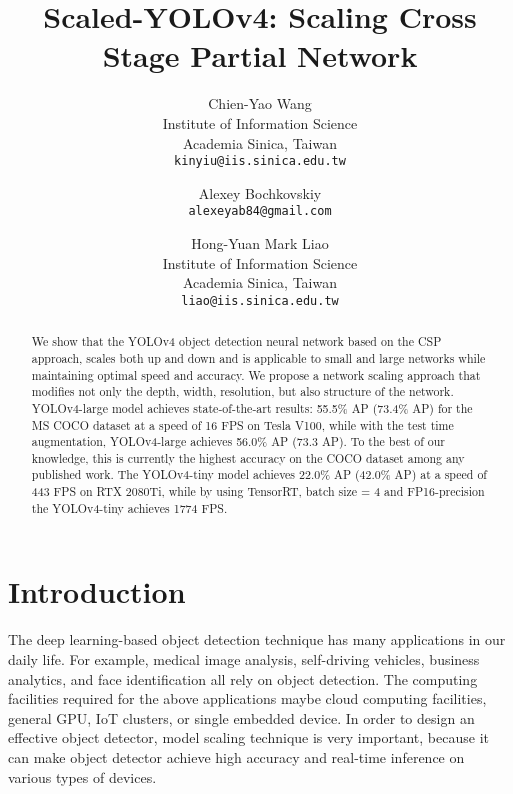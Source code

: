 \documentclass[10pt,twocolumn,letterpaper]{article}
\begin{document}
\title{Scaled-YOLOv4: Scaling Cross Stage Partial Network}

\author{Chien-Yao Wang\\
Institute of Information Science\\
Academia Sinica, Taiwan\\
{\tt\small kinyiu@iis.sinica.edu.tw}
\and
Alexey Bochkovskiy\\
{\tt\small alexeyab84@gmail.com}
\and
Hong-Yuan Mark Liao\\
Institute of Information Science\\
Academia Sinica, Taiwan\\
{\tt\small liao@iis.sinica.edu.tw}
}

\maketitle


\begin{abstract}
	We show that the YOLOv4 object detection neural network based on the CSP approach, scales both up and down and is applicable to small and large networks while maintaining optimal speed and accuracy. We propose a network scaling approach that modifies not only the depth, width, resolution, but also structure of the network. YOLOv4-large model achieves state-of-the-art results: 55.5\% AP (73.4\% AP) for the MS COCO dataset at a speed of  16 FPS on Tesla V100, while with the test time augmentation, YOLOv4-large achieves 56.0\% AP (73.3 AP). To the best of our knowledge, this is currently the highest accuracy on the COCO dataset among any published work. The YOLOv4-tiny model achieves 22.0\% AP (42.0\% AP) at a speed of 443 FPS on RTX 2080Ti, while by using TensorRT, batch size = 4 and FP16-precision the YOLOv4-tiny achieves 1774 FPS.
\end{abstract}

\section{Introduction}

The deep learning-based object detection technique has many applications in our daily life. For example, medical image analysis, self-driving vehicles, business analytics, and face identification all rely on object detection.  The computing facilities required for the above applications maybe cloud computing facilities, general GPU, IoT clusters, or single embedded device.  In order to design an effective object detector, model scaling technique is very important, because it can make object detector achieve high accuracy and real-time inference on various types of devices.
\end{document}
